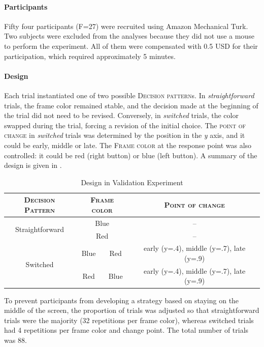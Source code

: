 \documentclass{article}
\begin{document}
\paragraph{Participants} Fifty four participants (F=27) were recruited using Amazon Mechanical Turk. Two subjects were excluded from the analyses because they did not use a mouse to perform the experiment. All of them were compensated with 0.5 USD for their participation, which required approximately 5 minutes. 

\paragraph{Design}
Each trial instantiated one of two possible \textsc{Decision pattern}s. In \textit{straightforward} trials, the frame color remained stable, and the decision made at the beginning of the trial did not need to be revised. Conversely, in \textit{switched} trials, the color swapped during the trial, forcing a revision of the initial choice. 
The \textsc{point of change} in \textit{switched} trials was determined by the position in the \textit{y} axis, and it could be early, middle or late. 
The \textsc{Frame color} at the response point was also controlled: it could be red (right button) or blue (left button).    
A summary of the design is given in . 


\begin{table}[!h]
\centering
\begin{tabular}{c|cc|c}
\textsc{Decision Pattern}&\multicolumn{2}{c|}{\textsc{Frame color}}&\textsc{Point of change}\\
\hline
\multirow{2}{*}{Straightforward} & \multicolumn{2}{c|}{Blue} & -- \\
& \multicolumn{2}{c|}{Red} & -- \\
\hline
\multirow{2}{*}{Switched} &Blue & Red & early (y=.4), middle (y=.7), late (y=.9) \\
 &  Red &  Blue & early (y=.4), middle (y=.7), late (y=.9) \\
\hline
\end{tabular}
\caption{Design in Validation Experiment}
\label{tab:design.validation}
\end{table}

To prevent participants from developing a strategy based on staying on the middle of the screen, the proportion of trials was adjusted so that straightforward trials were the majority (32 repetitions per frame color), whereas switched trials had 4 repetitions per frame color and change point. The total number of trials was 88.  
\end{document}
